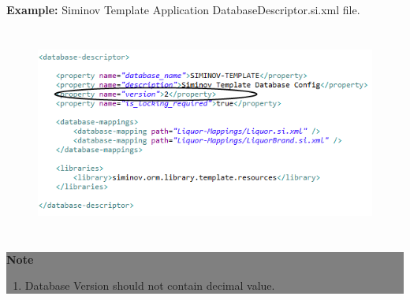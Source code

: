 		\par
		\textbf{Example:} Siminov Template Application DatabaseDescriptor.si.xml file.
		\begin{figure}[htbp]
			\centering
				\includegraphics[height=7cm]{Resources/siminov_template_application_database_version.png}
		\end{figure}

\begin{center}
	\colorbox{grey}{
		\parbox[t]{.8\linewidth}{
			\fontsize{11pt}{11pt}\selectfont %
			\vspace*{0.1cm} %
		
			\hfill \textbf{Note} \\

			\hfill 	
			\begin{enumerate}
			
				\item \small Database Version should not contain decimal value.

			\end{enumerate}

			\vspace*{0.0cm} %
		}
	}

\end{center}
